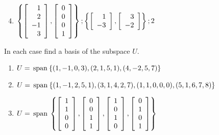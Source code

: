 {{\begin{multicols}{2}
\begin{ex}
\begin{sol}
\begin{enumerate}[label={\alph*.}]
\setcounter{enumi}{3}
\item 
$\left\{
\left[ \begin{array}{r}
1\\
2\\
-1\\
3
\end{array} \right], \left[ \begin{array}{r}
0\\
0\\
0\\
1
\end{array} \right]
\right\}; 
\left\{
\left[ \begin{array}{r}
1\\
-3
\end{array} \right], \left[ \begin{array}{r}
3\\
-2
\end{array} \right]
\right\}; 2$

\end{enumerate}
\end{sol}
\end{ex}

\begin{ex}
In each case find a basis of the subspace $U$.

\begin{enumerate}[label={\alph*.}]
\item $U = \thinspace\operatorname{span\medspace}\{(1, -1, 0, 3), (2, 1, 5, 1), (4, -2, 5, 7)\}$

\item $U = \thinspace\operatorname{span\medspace}\{(1, -1, 2, 5, 1), (3, 1, 4, 2, 7), \\ (1, 1, 0, 0, 0), (5, 1, 6, 7, 8)\}$

\item
$U = \thinspace\operatorname{span\medspace}
\left\{
\left[ \begin{array}{r}
1\\
1\\
0\\
0
\end{array} \right], \left[ \begin{array}{r}
0\\
0\\
1\\
1
\end{array} \right], \left[ \begin{array}{r}
1\\
0\\
1\\
0
\end{array} \right], \left[ \begin{array}{r}
0\\
1\\
0\\
1
\end{array} \right]
\right\}$


\end{enumerate}
\end{ex}
\end{multicols}}}
